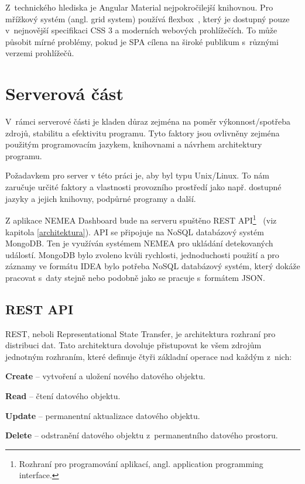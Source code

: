 Z~technického hlediska je Angular Material nejpokročilejší knihovnou. Pro mřížkový systém (angl. grid system) používá flexbox~\cite{flexbox}, který je dostupný pouze v~nejnovější specifikaci CSS 3 a moderních webových prohlížečích. To může působit mírné problémy, pokud je SPA cílena na široké publikum s~různými verzemi prohlížečů.


\section{Serverová část}

V~rámci serverové části je kladen důraz zejména na poměr výkonnost/spotřeba zdrojů, stabilitu a efektivitu programu. Tyto faktory jsou ovlivněny zejména použitým programovacím jazykem, knihovnami a návrhem architektury programu.

Požadavkem pro server v této práci je, aby byl typu Unix/Linux. To nám zaručuje určité faktory a vlastnosti provozního prostředí jako např. dostupné jazyky a jejich knihovny, podpůrné programy a další.

Z aplikace NEMEA Dashboard bude na serveru spuštěno REST API\footnote{Rozhraní pro programování aplikací, angl. application programming interface.}~\cite{rest} (viz kapitola \ref{architektura}). API se připojuje na NoSQL databázový systém MongoDB. Ten je využíván systémem NEMEA pro ukládání detekovaných událostí. MongoDB bylo zvoleno kvůli rychlosti, jednoduchosti použití a pro záznamy ve formátu IDEA bylo potřeba NoSQL databázový systém, který dokáže pracovat s~daty stejně nebo podobně jako se pracuje s~formátem JSON.

\subsection{REST API}
\label{crud}

REST, neboli Representational State Transfer, je architektura rozhraní pro distribuci dat. Tato architektura dovoluje přistupovat ke všem zdrojům jednotným rozhraním, které definuje čtyři základní operace nad každým z~nich:

\begin{description}
    \item {\bf Create} -- vytvoření a uložení nového datového objektu.
    \item {\bf Read} -- čtení datového objektu.
    \item {\bf Update} -- permanentní aktualizace datového objektu.
    \item {\bf Delete} -- odstranění datového objektu z~permanentního datového prostoru.
\end{description}

